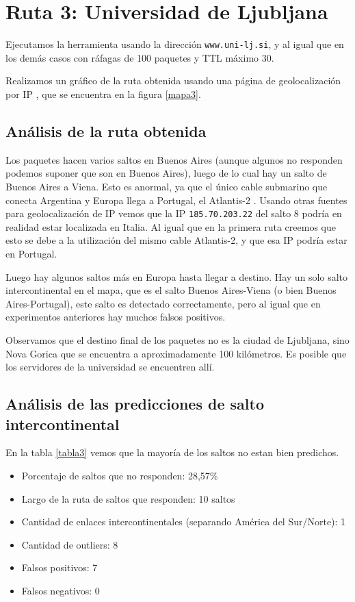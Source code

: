 \section{Ruta 3: Universidad de Ljubljana}

Ejecutamos la herramienta usando la dirección \texttt{www.uni-lj.si}, y al igual que en los demás casos con ráfagas de 100 paquetes y TTL máximo 30.

Realizamos un gráfico de la ruta obtenida usando una página de geolocalización por IP \cite{ip2location}, que se encuentra en la figura \ref{mapa3}.

\subsection{Análisis de la ruta obtenida}

Los paquetes hacen varios saltos en Buenos Aires (aunque algunos no responden podemos suponer que son en Buenos Aires), luego de lo cual hay un salto de Buenos Aires a Viena. Esto es anormal, ya que el único cable submarino que conecta Argentina y Europa llega a Portugal, el Atlantis-2 \cite{atlantis2}. Usando otras fuentes para geolocalización de IP vemos que la IP \texttt{185.70.203.22} del salto 8 podría en realidad estar localizada en Italia. Al igual que en la primera ruta creemos que esto se debe a la utilización del mismo cable Atlantis-2, y que esa IP podría estar en Portugal.

Luego hay algunos saltos más en Europa hasta llegar a destino. Hay un solo salto intercontinental en el mapa, que es el salto Buenos Aires-Viena (o bien Buenos Aires-Portugal), este salto es detectado correctamente, pero al igual que en experimentos anteriores hay muchos falsos positivos.

Observamos que el destino final de los paquetes no es la ciudad de Ljubljana, sino Nova Gorica que se encuentra a aproximadamente 100 kilómetros. Es posible que los servidores de la universidad se encuentren allí.

\subsection{Análisis de las predicciones de salto intercontinental}

En la tabla \ref{tabla3} vemos que la mayoría de los saltos no estan bien predichos.

\begin{itemize}
	\item Porcentaje de saltos que no responden: 28,57\%
	\item Largo de la ruta de saltos que responden: 10 saltos 
	\item Cantidad de enlaces intercontinentales (separando América del Sur/Norte): 1
	\item Cantidad de outliers: 8
	\item Falsos positivos: 7
	\item Falsos negativos: 0
\end{itemize}

